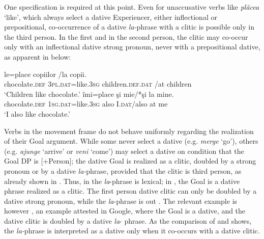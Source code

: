\documentclass[output=paper,colorlinks,citecolor=brown,nonflat]{langsci/langscibook}
\begin{document}
One specification is required at this point. Even for unaccusative verbs like \textit{plăcea} ‘like’, which always select a dative Experiencer, either inflectional or prepositional, co-occurrence of a dative \textit{la-}phrase with a clitic is possible only in the third person. In the first and in the second person, the clitic may co-occur only with an inflectional dative strong pronoun, never with a prepositional dative, as apparent in  below:

\ea%
    \label{ex:cornilescu:10}
    \ea
                 {le=place}                    {copiilor}                            /{la} {copii}. 	\\
    	chocolate.\textsc{def}  \textsc{3pl.dat}=like.\textsc{3sg} children.\textsc{def}.\textsc{dat} /at children	\\
    \glt‘Children like chocolate.’
    \ex \label{ex:cornilescu:10b}
     {îmi=place} {şi} {mie}/*şi {la} mine.\\
    	chocolate.\textsc{def}  \textsc{1sg.dat}=like.\textsc{3sg} also I.\textsc{dat}/also at me\\
    \glt ‘I also like chocolate.’
    \z
    \z

Verbs in the movement frame do not behave uniformly regarding the realization of their Goal argument. While some never select a dative (e.g. \textit{merge} ‘go’), others (e.g. \textit{ajunge} ‘arrive’ or \textit{veni} ‘come’) may select a dative on condition that the Goal DP is [+Person]; the dative Goal is realized as a clitic, doubled by a strong pronoun or by a dative \textit{la-}phrase, provided that the clitic is third person, as already shown in . Thus, in  the \textit{la}-phrase is lexical; in , the Goal is a dative phrase realized as a clitic. The first person dative clitic can only be doubled by a dative strong pronoun, while the \textit{la}{}-phrase is out . The relevant example is however , an example attested in Google, where the Goal is a dative, and the dative clitic is doubled by a dative \textit{la}{}- phrase. As the comparison of  and  shows, the \textit{la-}phrase is interpreted as a dative only when it co-occurs with a dative clitic.
\end{document}
